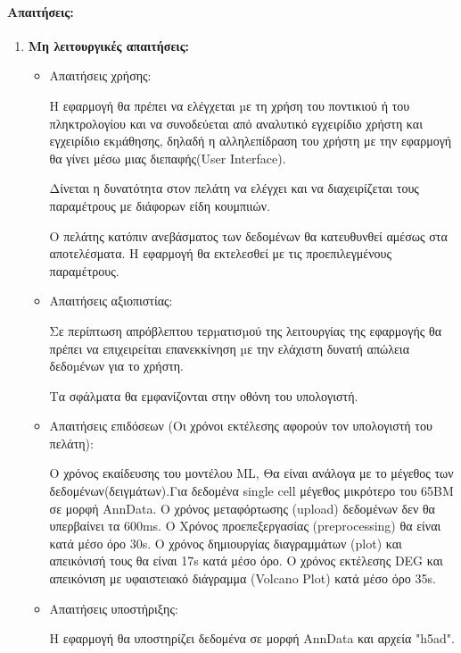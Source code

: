\documentclass{article}  %
\begin{document}
\paragraph{Απαιτήσεις:}
\begin{enumerate}
    \item \textbf{Μη λειτουργικές απαιτήσεις:}
    \begin{itemize}
        \item Απαιτήσεις χρήσης:
        
            Η εφαρμογή θα πρέπει να ελέγχεται µε τη χρήση του ποντικιού ή του πληκτρολογίου και να συνοδεύεται από αναλυτικό εγχειρίδιο χρήστη και εγχειρίδιο εκµάθησης, δηλαδή η αλληλεπίδραση του χρήστη με την εφαρμογή θα γίνει μέσω μιας διεπαφής(User Interface).

            Δίνεται η δυνατότητα στον πελάτη να ελέγχει και να διαχειρίζεται τους παραμέτρους με διάφορων είδη κουμπιιών.
            
            Ο πελάτης κατόπιν ανεβάσματος των δεδομένων θα κατευθυνθεί αμέσως στα αποτελέσματα. Η εφαρμογή θα εκτελεσθεί με τις προεπιλεγμένους παραμέτρους.
            
        \item Απαιτήσεις αξιοπιστίας:
        
            Σε περίπτωση απρόβλεπτου τερµατισµού της λειτουργίας της εφαρμογής θα πρέπει να επιχειρείται επανεκκίνηση µε την ελάχιστη δυνατή απώλεια δεδοµένων για το χρήστη.

            Τα σφάλματα θα εμφανίζονται στην οθόνη του υπολογιστή.
            
        \item Απαιτήσεις επιδόσεων (Οι χρόνοι εκτέλεσης αφορούν τον υπολογιστή του πελάτη):

            Ο χρόνος εκαίδευσης του μοντέλου  {ML}, Θα είναι ανάλογα με το μέγεθος των δεδομένων(δειγμάτων).Για δεδομένα single cell μέγεθος μικρότερο του 65BM σε μορφή AnnData.
            Ο χρόνος μεταφόρτωσης (upload) δεδομένων δεν θα υπερβαίνει τα 600ms.
            Ο Χρόνος προεπεξεργασίας (preprocessing) θα είναι κατά μέσο όρο 30s.
            Ο χρόνος δημιουργίας διαγραμμάτων (plot) και απεικόνισή τους θα είναι 17s κατά μέσο όρο.
            Ο χρόνος εκτέλεσης DEG και απεικόνιση με υφαιστειακό διάγραμμα (Volcano Plot) κατά μέσο όρο 35s.
            
        \item Απαιτήσεις υποστήριξης:

            Η εφαρμογή θα υποστηρίζει δεδομένα σε μορφή AnnData και αρχεία "h5ad".
            

\end{itemize}
\end{enumerate}
\end{document}
